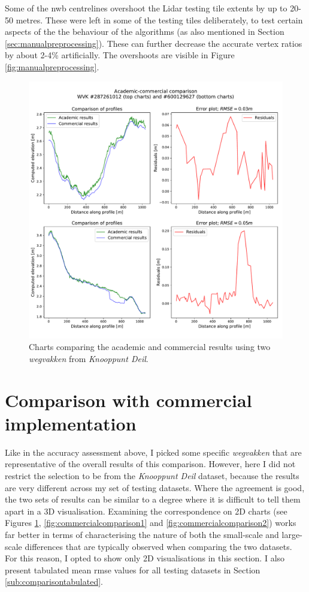Some of the \ac{nwb} centrelines overshoot the Lidar testing tile extents by up to 20-50 metres. These were left in some of the testing tiles deliberately, to test certain aspects of the the behaviour of the algorithms (as also mentioned in Section \ref{sec:manualpreprocessing}). These can further decrease the accurate vertex ratios by about 2-4\% artificially. The overshoots are visible in Figure \ref{fig:manualpreprocessing}.

\begin{figure}[h]
    \centering
    \includegraphics[width=0.87\linewidth]{final_report/figs/commercialcomparison0.pdf}
    \caption[Charts comparing the academic and commercial results (\textit{Knooppunt Deil})]{Charts comparing the academic and commercial results using two \textit{wegvakken} from \textit{Knooppunt Deil}.}
    \label{fig:commercialcomparison0}
\end{figure}

\section{Comparison with commercial implementation}
\label{sec:r_comparison}

Like in the accuracy assessment above, I picked some specific \textit{wegvakken} that are representative of the overall results of this comparison. However, here I did not restrict the selection to be from the \textit{Knooppunt Deil} dataset, because the results are very different across my set of testing datasets. Where the agreement is good, the two sets of results can be similar to a degree where it is difficult to tell them apart in a 3D visualisation. Examining the correspondence on 2D charts (see Figures \ref{fig:commercialcomparison0}, \ref{fig:commercialcomparison1} and \ref{fig:commercialcomparison2}) works far better in terms of characterising the nature of both the small-scale and large-scale differences that are typically observed when comparing the two datasets. For this reason, I opted to show only 2D visualisations in this section. I also present tabulated mean \ac{rmse} values for all testing datasets in Section \ref{sub:comparisontabulated}.

